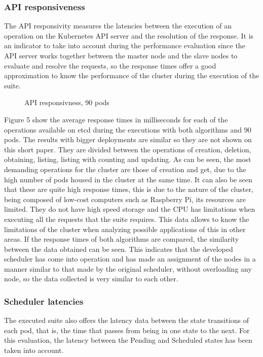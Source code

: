 \documentclass[conference]{IEEEtran}
\begin{document}
\subsubsection{API responsiveness}\label{sec:apiresp}
The API responsivity measures the latencies between the execution of an operation on the Kubernetes API server and the resolution of the response. It is an indicator to take into account during the 
performance evaluation since the API server works together between the master node and the slave nodes to evaluate and resolve the requests, so the response times offer a good approximation to know the 
performance of the cluster during the execution of the suite.

\begin{figure}[h]
\begin{center}
\strut{}
\caption{API responsivness, 90 pods}\label{fig:cluster}
\end{center}
\end{figure}

Figure 5 show the average response times in milliseconds for each of the operations available on etcd during the executions with both algorithms and 90 pods. The results with bigger deployments are similar so they are not shown on this short paper. They are divided between the operations of creation, deletion, obtaining, listing, listing with counting and updating. As can be seen, the most demanding operations for the cluster are those of creation and get, due to the high number of pods housed in the cluster at the same time. It can also be seen that these are quite high response times, this is due to the nature of the cluster, being composed of low-cost computers such as Raspberry Pi, its resources are limited. They do not have high speed storage and the CPU has limitations when executing all the requests that the suite requires. This data allows to know the limitations of the cluster when analyzing possible applications of this in other areas. If the response times of both algorithms are compared, the similarity between the data obtained can be seen. This indicates that the developed scheduler has come into operation and has made an assignment of the nodes in a manner similar to that made by the original scheduler, without overloading any node, so the data collected is very similar to each other.


\subsubsection{Scheduler latencies}\label{sec:schedlat}
The executed suite also offers the latency data between the state transitions of each pod, that is, the time that passes from being in one state to the next. For this evaluation, the latency between the Pending and Scheduled states has been taken into account.
\end{document}

